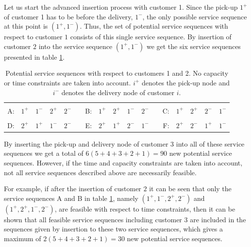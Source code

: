 \documentclass[dissertation,draft*]{aaltoseries}
\begin{document}
Let us start the advanced insertion process with customer 1.
Since the pick-up $1^{+}$ of customer 1 has to be before the delivery, $1^{-}$, 
the only possible service sequence at this point is $( 1^{+},  1^{-})$. Thus, the 
set of potential service sequences with respect to customer $1$ consists of this single service sequence. 
By insertion of customer $2$ into the service sequence $( 1^{+}, 1^{-})$ we get the six 
service sequences presented in table \ref{ykskakstaulukko01}.
\begin{table}[ht] 
\caption{Potential service sequences with respect to customers 1 and 2. 
No capacity or time constraints are taken into account. 
$i^{+}$ denotes the pick-up node and $i^{-}$ denotes
the delivery node of customer $i$.} 
\centering     
\begin{tabular}{|rrrrrr|rrrrrr|rrrrr|}  
\hline  & & & & & & & & & & & &  & & & &  \\ [-0.7em]                
A: & $ 1^{+} $ & $  1^{-} $ & $  2^{+} $ & $  2^{-} $ & & 
B: & $ 1^{+} $ & $  2^{+} $ & $  1^{-} $ & $  2^{-} $ & & 
C: & $ 1^{+} $ & $  2^{+} $ & $  2^{-} $ & $  1^{-} $ \\ [1ex]
\hline & & & & & & & & & & & &  & & & &  \\ [-0.7em]
D: & $ 2^{+} $ & $  1^{+} $ & $  1^{-} $ & $  2^{-} $ & & 
E: & $ 2^{+} $ & $  1^{+} $ & $ 2^{-} $ & $  1^{-} $ & & 
F: & $ 2^{+} $ & $  2^{-} $ & $  1^{+} $ & $  1^{-} $ \\ [1ex] 
\hline                      
\end{tabular} 
\label{ykskakstaulukko01} 
\end{table} 


By inserting the pick-up and delivery node of customer $3$ into all of these service sequences we get a total
of $6(5+4+3+2+1) = 90$ new potential service sequences. However, if the time and capacity
constraints are taken into account, not all service sequences described above are necessarily feasible.

For example, if after the insertion of customer $2$ it can be seen that only the
service sequences A and B in table \ref{ykskakstaulukko01}, namely 
$( 1^{+}, 1^{-}, 2^{+}, 2^{-})$ and $( 1^{+}, 2^{+}, 1^{-}, 2^{-})$,
are feasible with respect to time constraints, then it can be
shown that all feasible service sequences including customer $3$ are included in
the sequences given by insertion to these two service sequences, which gives
a maximum of $2(5+4+3+2+1) = 30$ new potential service sequences.
\end{document}
